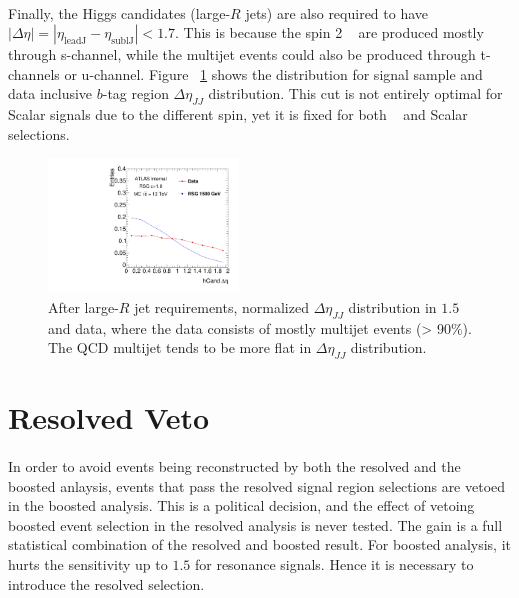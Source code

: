 \paragraph{}
Finally, the Higgs candidates (large-$R$ jets) are also required to have $|\Delta\eta| = |\eta_{\text{leadJ}} -\eta_{\text{sublJ}} |< 1.7$. 
This is because the spin 2 \Grav~ are produced mostly through s-channel, while the multijet events could also be produced through t-channels or u-channel. 
Figure ~\ref{fig:app-check-deta} shows the distribution for signal sample and data inclusive $b$-tag region $\Delta \eta_{JJ}$ distribution.
This cut is not entirely optimal for Scalar signals due to the different spin, yet it is fixed for both \Grav~ and Scalar selections.

\begin{figure}
\begin{center}
  \includegraphics[width=0.45\textwidth,angle=-90]{figures/boosted/Other/AllTag_Signal_hCandDeta_F_c10-cb-no-deta-cut_truth_0.pdf}
  \caption{ After large-$R$ jet requirements, normalized $\Delta \eta_{JJ}$ distribution in $1.5$ \TeV \Grav~ and data, where the data consists of mostly multijet events (> 90$\%$). The QCD multijet tends to be more flat in $\Delta \eta_{JJ}$ distribution.}
\label{fig:app-check-deta}
\end{center}
\end{figure}


\section{Resolved Veto}
\label{sec:resollvedveto}
\paragraph{}
In order to avoid events being reconstructed by both the resolved and the boosted anlaysis, events that pass the resolved signal region selections are vetoed in the boosted analysis.
This is a political decision, and the effect of vetoing boosted event selection in the resolved analysis is never tested.
The gain is a full statistical combination of the resolved and boosted result.
For boosted analysis,  it hurts the sensitivity up to $1.5$ \TeV for resonance signals.
Hence it is necessary to introduce the resolved selection.

